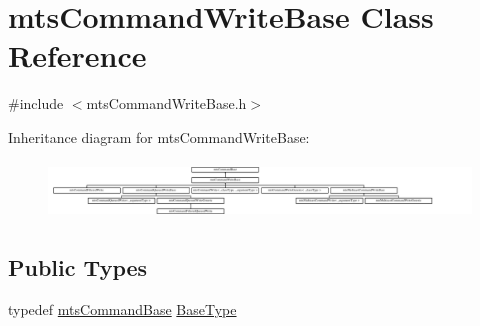 \hypertarget{classmts_command_write_base}{}\section{mts\+Command\+Write\+Base Class Reference}
\label{classmts_command_write_base}


{\ttfamily \#include $<$mts\+Command\+Write\+Base.\+h$>$}

Inheritance diagram for mts\+Command\+Write\+Base\+:\begin{figure}[H]
\begin{center}
\leavevmode
\includegraphics[height=1.525054cm]{da/d89/classmts_command_write_base}
\end{center}
\end{figure}
\subsection*{Public Types}
\begin{DoxyCompactItemize}
\item 
typedef \hyperlink{classmts_command_base}{mts\+Command\+Base} \hyperlink{classmts_command_write_base_a5d78c8590cfc73fa29d93b3678cba199}{Base\+Type}
\end{DoxyCompactItemize}
